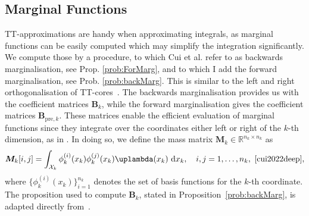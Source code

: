 \subsection{Marginal Functions}
\label{subsec:TTMarg}
TT-approximations are handy when approximating integrals, as marginal functions can be easily computed which may simplify the integration significantly.
We compute those by a procedure, to which Cui et al. \cite{cui2022deep} refer to as backwards marginalisation, see Prop. \ref{prob:ForMarg}, and to which I add the forward marginalisation, see Prob. \ref{prob:backMarg}. 
This is similar to the left and right orthogonalisation of TT-cores~\cite{oseledets2011tensor, Oseledets2011DMRG}.
The backwards marginalisation provides us with the coefficient matrices $\bm{B}_k$, while the forward marginalisation gives the coefficient matrices $\bm{B}_{\text{pre}, k}$. 
These matrices enable the efficient evaluation of marginal functions since they integrate over the coordinates either left or right of the $k$-th dimension, as in \cite{cui2022deep}.
In doing so, we define the mass matrix $\bm{M}_k \in \mathbb{R}^{n_k \times n_k}$ as
\begin{equation}
	\bm{M}_k[i, j] = \int_{\mathcal{X}_k} \phi^{(i)}_k(x_k) \phi^{(j)}_k(x_k) \uplambda(x_k) \, \diff x_k, \quad i, j = 1, \dots, n_k, \, \,  \text{\cite[Eq. 22]{cui2022deep}},
\end{equation}
where $\{\phi^{(i)}_k(x_k)\}_{i=1}^{n_k}$ denotes the set of basis functions for the $k$-th coordinate.
The proposition used to compute $\bm{B}_k$, stated in Proposition~\ref{prob:backMarg}, is adapted directly from~\cite{cui2022deep}.

